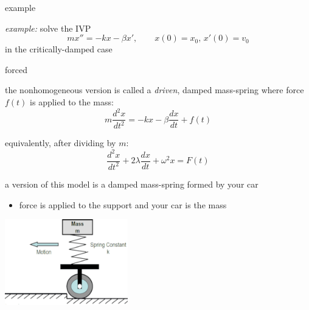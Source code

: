 \documentclass[dvipsnames,colorlinks]{beamer}
\begin{document}
\begin{frame}{example}

\noindent \emph{example:} solve the IVP
    $$mx'' = -kx - \beta x', \qquad x(0) = x_0, \, x'(0) = v_0$$
in the critically-damped case

\vspace{50mm}
\end{frame}


\begin{frame}{forced}

\begin{itemize}
\item the nonhomogeneous version is called a \emph{driven}, damped mass-spring where force $f(t)$ is applied to the mass:
    $$m \frac{d^2x}{dt^2} = - k x - \beta \frac{dx}{dt} + f(t)$$
\item equivalently, after dividing by $m$:
    $$\frac{d^2x}{dt^2} + 2 \lambda \frac{dx}{dt} + \omega^2 x=F(t)$$

\begin{minipage}[t]{0.5\textwidth}
\item a version of this model is a damped mass-spring formed by your car
    \begin{itemize}
    \item force is applied to the support and your car is the mass
    \end{itemize}
\end{minipage}
\end{itemize}

\vspace{-20mm}
\hfill \includegraphics[width=0.4\textwidth]{figs/carbump}
\end{frame}
\end{document}
